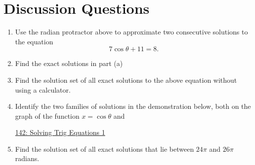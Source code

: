 \documentclass{ximera}
\begin{document}
\section{Discussion Questions}

\begin{question}  \label{Q:4dDFEFR33g3e}

 
\begin{onlineOnly}
    \begin{center}
\end{center}
\end{onlineOnly}

\begin{enumerate}
\item Use the radian protractor above to approximate two consecutive solutions to the equation
\[
   7 \cos\theta +11 =  8 .  
\]

\item Find the exact solutions in part (a)

\item Find the solution set of all exact solutions to the above equation without using a calculator.

\item Identify the two families of solutions in the demonstration below, both on the graph of the function $x=\cos\theta$ and 

\href{https://www.desmos.com/calculator/7wxtwpklzp}{142: Solving Trig Equations 1}
 
\begin{onlineOnly}
    \begin{center}
\end{center}
\end{onlineOnly}


\item Find the solution set of all exact solutions that lie between $24\pi$ and $26\pi$ radians.

\end{enumerate}
\end{question}
\end{document}
